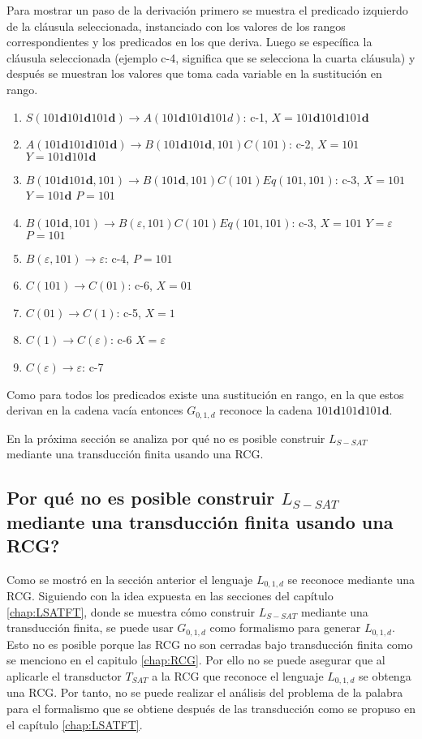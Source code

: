Para mostrar un paso de la derivación primero se muestra el predicado izquierdo de la cláusula seleccionada, instanciado con los valores de los rangos correspondientes y los predicados en los que deriva. Luego se específica la cláusula seleccionada (ejemplo c-4, significa que se selecciona la cuarta cláusula) y después se muestran los valores que toma cada variable en la sustitución en rango.

\begin{enumerate}
    \item $S(101\mathbf{d}101\mathbf{d}101\mathbf{d}) \to A(101\mathbf{d}101\mathbf{d}101d)$: c-1, $X=101\mathbf{d}101\mathbf{d}101\mathbf{d}$
    \item $A(101\mathbf{d}101\mathbf{d}101\mathbf{d}) \to B(101\mathbf{d}101\mathbf{d},101)C(101)$: c-2, $X=101$ $Y=101\mathbf{d}101\mathbf{d}$
    \item $B(101\mathbf{d}101\mathbf{d},101) \to B(101\mathbf{d},101)C(101)Eq(101,101)$: c-3, $X=101$ $Y=101\mathbf{d}$ $P=101$
    \item $B(101\mathbf{d},101) \to B(\varepsilon,101)C(101)Eq(101,101)$: c-3, $X=101$ $Y=\varepsilon$ $P=101$
    \item $B(\varepsilon,101) \to \varepsilon$: c-4, $P=101$
    \item $C(101)\to C(01)$: c-6, $X=01$
    \item $C(01)\to C(1)$: c-5, $X=1$
    \item $C(1)\to C(\varepsilon)$: c-6 $X=\varepsilon$
    \item $C(\varepsilon)\to \varepsilon$: c-7
\end{enumerate}

Como para todos los predicados existe una sustitución en rango, en la que estos derivan en la cadena vacía entonces  $G_{0,1,d}$ reconoce la cadena $101\mathbf{d}101\mathbf{d}101\mathbf{d}$. 

En la próxima sección se analiza por qué no es posible construir $L_{S-SAT}$ mediante una transducción finita usando
una RCG.

\subsection{Por qué no es posible construir $L_{S-SAT}$ mediante una transducción finita usando una RCG?}

Como se mostró en la sección anterior el lenguaje $L_{0,1,d}$ se reconoce mediante una RCG.  Siguiendo con la idea 
expuesta en las secciones del capítulo \ref{chap:LSATFT}, donde se muestra cómo construir $L_{S-SAT}$ mediante 
una transducción finita, se puede usar $G_{0,1,d}$ como formalismo para generar $L_{0,1,d}$.  Esto no es posible 
porque las RCG no son cerradas bajo transducción finita como se menciono en el capitulo \ref{chap:RCG}.  Por ello no se puede asegurar que al aplicarle el transductor $T_{SAT}$ a la RCG que reconoce el lenguaje $L_{0,1,d}$ se obtenga una RCG. Por tanto, no se puede realizar el análisis del problema de la palabra para el formalismo que se obtiene después de las transducción como se propuso en el capítulo \ref{chap:LSATFT}.

